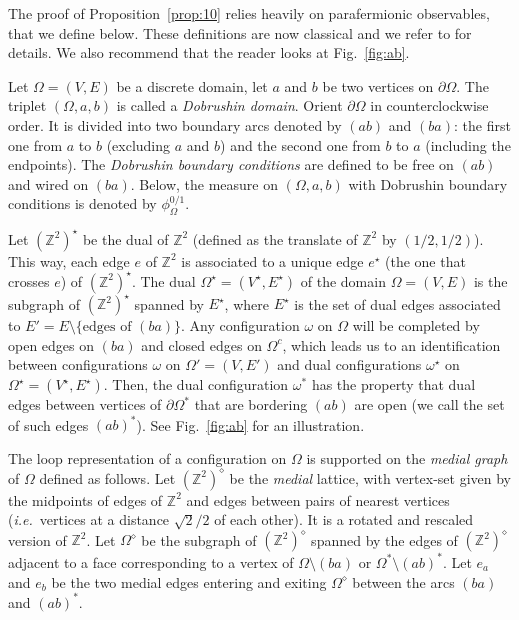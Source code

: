 \documentclass[a4paper,oneside,11pt]{article}
\numberwithin{equation}{section}
\numberwithin{equation}{section}
\numberwithin{equation}{section}
\newcommand{\bbZ}{\mathbb{Z}}
\begin{document}
The proof of Proposition~\ref{prop:10} relies heavily on parafermionic observables, that we define below.
 These definitions are now classical and we refer to \cite{Dum17a} for details. We also recommend that the reader looks at Fig.~\ref{fig:ab}.  

Let $\Omega=(V,E)$ be a discrete domain, let $a$ and $b$ be two vertices on $\partial \Omega$. The triplet $(\Omega,a,b)$ is called a {\em Dobrushin domain}. Orient $\partial \Omega$ in counterclockwise order. It is divided into two boundary arcs denoted by $(ab)$ and $(ba)$: the first one from $a$ to $b$ (excluding $a$ and $b$) and the second one from $b$ to $a$ (including the endpoints). 
The {\em Dobrushin boundary conditions} are defined to be free on $(ab)$ and wired on $(ba)$. 
Below, the measure on $(\Omega,a,b)$ with Dobrushin boundary conditions is denoted by $\phi^{0/1}_{\Omega}$.

Let $(\mathbb Z^2)^\star$ be the dual of $\mathbb Z^2$ (defined as the translate of $\mathbb Z^2$ by $(1/2,1/2)$). This way, each edge $e$  of $\mathbb Z^2$ is associated to a unique edge $e^\star$ (the one that crosses $e$) of $(\mathbb Z^2)^\star$. The dual $\Omega^\star=(V^\star,E^{\star})$ of the domain $\Omega=(V,E)$ is the subgraph of $(\mathbb Z^2)^\star$ spanned by $E^\star$, where $E^\star$ is the set of dual edges associated to $E'=E\setminus\{\text{edges of $(ba)$}\}$. 
Any configuration $\omega$ on $\Omega$ will be completed by open edges on $(ba)$ and closed edges on $\Omega^c$, which leads us to an identification between configurations $\omega$ on $\Omega'=(V,E')$ and dual configurations $\omega^\star$ on $\Omega^\star=(V^\star,E^\star)$.  Then, the dual configuration $\omega^*$ has the property that dual edges between vertices of $\partial\Omega^*$ that are bordering $(ab)$ are open (we call the set of such edges $(ab)^*$). See Fig.~\ref{fig:ab} for an illustration.

The loop representation of a configuration on $\Omega$ is supported on the {\em medial graph} of $\Omega$ defined as follows. 
Let $(\bbZ^2)^\diamond$ be the {\em medial} lattice, with vertex-set given by the midpoints of edges of $\bbZ^2$ and edges between pairs of nearest vertices (\emph{i.e.}~vertices at a distance $\sqrt 2/2$ of each other). It is a rotated and rescaled version of $\bbZ^2$.   
Let $\Omega^\diamond$ be the subgraph of $(\bbZ^2)^\diamond$ spanned by the edges of $(\bbZ^2)^\diamond$ adjacent to a face corresponding to a vertex of $\Omega\setminus (ba)$ or $\Omega^* \setminus (ab)^*$. 
Let $e_a$ and $e_b$ be the two medial edges entering and exiting $\Omega^\diamond$ between the arcs $(ba)$ and $(ab)^*$.
\end{document}
